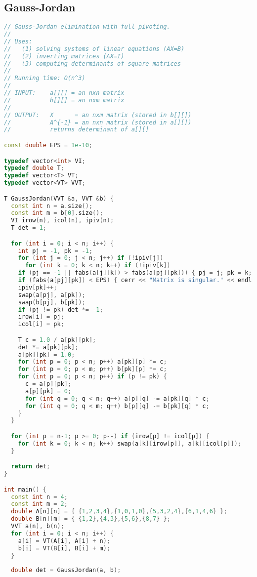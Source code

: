 \subsection{Gauss-Jordan}
\begin{lstlisting}[language=C++]
// Gauss-Jordan elimination with full pivoting.
//
// Uses:
//   (1) solving systems of linear equations (AX=B)
//   (2) inverting matrices (AX=I)
//   (3) computing determinants of square matrices
//
// Running time: O(n^3)
//
// INPUT:    a[][] = an nxn matrix
//           b[][] = an nxm matrix
//
// OUTPUT:   X      = an nxm matrix (stored in b[][])
//           A^{-1} = an nxn matrix (stored in a[][])
//           returns determinant of a[][]

const double EPS = 1e-10;

typedef vector<int> VI;
typedef double T;
typedef vector<T> VT;
typedef vector<VT> VVT;

T GaussJordan(VVT &a, VVT &b) {
  const int n = a.size();
  const int m = b[0].size();
  VI irow(n), icol(n), ipiv(n);
  T det = 1;

  for (int i = 0; i < n; i++) {
    int pj = -1, pk = -1;
    for (int j = 0; j < n; j++) if (!ipiv[j])
      for (int k = 0; k < n; k++) if (!ipiv[k])
	if (pj == -1 || fabs(a[j][k]) > fabs(a[pj][pk])) { pj = j; pk = k; }
    if (fabs(a[pj][pk]) < EPS) { cerr << "Matrix is singular." << endl; exit(0); }
    ipiv[pk]++;
    swap(a[pj], a[pk]);
    swap(b[pj], b[pk]);
    if (pj != pk) det *= -1;
    irow[i] = pj;
    icol[i] = pk;

    T c = 1.0 / a[pk][pk];
    det *= a[pk][pk];
    a[pk][pk] = 1.0;
    for (int p = 0; p < n; p++) a[pk][p] *= c;
    for (int p = 0; p < m; p++) b[pk][p] *= c;
    for (int p = 0; p < n; p++) if (p != pk) {
      c = a[p][pk];
      a[p][pk] = 0;
      for (int q = 0; q < n; q++) a[p][q] -= a[pk][q] * c;
      for (int q = 0; q < m; q++) b[p][q] -= b[pk][q] * c;      
    }
  }

  for (int p = n-1; p >= 0; p--) if (irow[p] != icol[p]) {
    for (int k = 0; k < n; k++) swap(a[k][irow[p]], a[k][icol[p]]);
  }

  return det;
}

int main() {
  const int n = 4;
  const int m = 2;
  double A[n][n] = { {1,2,3,4},{1,0,1,0},{5,3,2,4},{6,1,4,6} };
  double B[n][m] = { {1,2},{4,3},{5,6},{8,7} };
  VVT a(n), b(n);
  for (int i = 0; i < n; i++) {
    a[i] = VT(A[i], A[i] + n);
    b[i] = VT(B[i], B[i] + m);
  }
  
  double det = GaussJordan(a, b);
  

\end{lstlisting}
